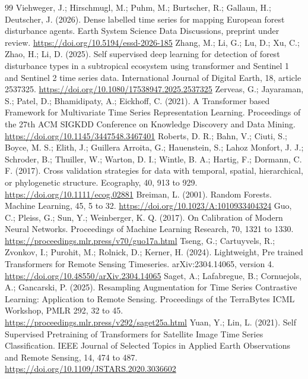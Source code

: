 \documentclass[10pt,a4paper,twocolumn]{article}
\begin{document}
\begin{thebibliography}{99}
\footnotesize
{} Viehweger, J.; Hirschmugl, M.; Puhm, M.; Burtscher, R.; Gallaun, H.; Deutscher, J. (2026). Dense labelled time series for mapping European forest disturbance agents. Earth System Science Data Discussions, preprint under review. \url{https://doi.org/10.5194/essd-2026-185}
 Zhang, M.; Li, G.; Lu, D.; Xu, C.; Zhao, H.; Li, D. (2025). Self supervised deep learning for detection of forest disturbance types in a subtropical ecosystem using transformer and Sentinel 1 and Sentinel 2 time series data. International Journal of Digital Earth, 18, article 2537325. \url{https://doi.org/10.1080/17538947.2025.2537325}
 Zerveas, G.; Jayaraman, S.; Patel, D.; Bhamidipaty, A.; Eickhoff, C. (2021). A Transformer based Framework for Multivariate Time Series Representation Learning. Proceedings of the 27th ACM SIGKDD Conference on Knowledge Discovery and Data Mining. \url{https://doi.org/10.1145/3447548.3467401}
 Roberts, D. R.; Bahn, V.; Ciuti, S.; Boyce, M. S.; Elith, J.; Guillera Arroita, G.; Hauenstein, S.; Lahoz Monfort, J. J.; Schroder, B.; Thuiller, W.; Warton, D. I.; Wintle, B. A.; Hartig, F.; Dormann, C. F. (2017). Cross validation strategies for data with temporal, spatial, hierarchical, or phylogenetic structure. Ecography, 40, 913 to 929. \url{https://doi.org/10.1111/ecog.02881}
 Breiman, L. (2001). Random Forests. Machine Learning, 45, 5 to 32. \url{https://doi.org/10.1023/A:1010933404324}
 Guo, C.; Pleiss, G.; Sun, Y.; Weinberger, K. Q. (2017). On Calibration of Modern Neural Networks. Proceedings of Machine Learning Research, 70, 1321 to 1330. \url{https://proceedings.mlr.press/v70/guo17a.html}
 Tseng, G.; Cartuyvels, R.; Zvonkov, I.; Purohit, M.; Rolnick, D.; Kerner, H. (2024). Lightweight, Pre trained Transformers for Remote Sensing Timeseries. arXiv:2304.14065, version 4. \url{https://doi.org/10.48550/arXiv.2304.14065}
 Saget, A.; Lafabregue, B.; Cornuejols, A.; Gancarski, P. (2025). Resampling Augmentation for Time Series Contrastive Learning: Application to Remote Sensing. Proceedings of the TerraBytes ICML Workshop, PMLR 292, 32 to 45. \url{https://proceedings.mlr.press/v292/saget25a.html}
 Yuan, Y.; Lin, L. (2021). Self Supervised Pretraining of Transformers for Satellite Image Time Series Classification. IEEE Journal of Selected Topics in Applied Earth Observations and Remote Sensing, 14, 474 to 487. \url{https://doi.org/10.1109/JSTARS.2020.3036602}

\end{thebibliography}
\end{document}
